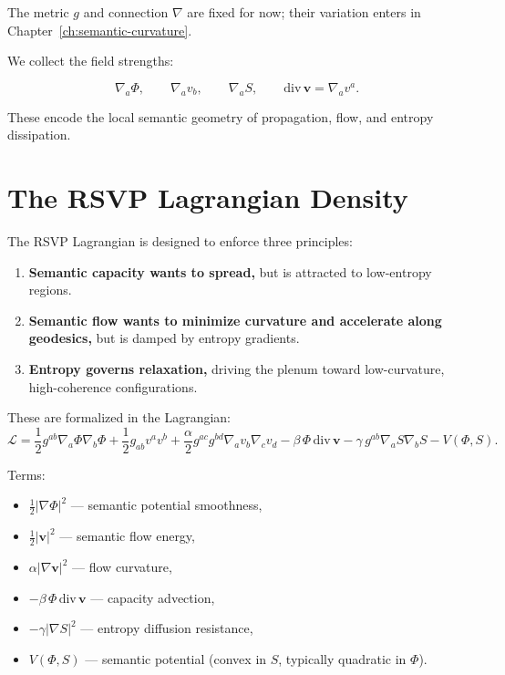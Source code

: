 The metric $g$ and connection $\nabla$ are fixed for now; their variation enters in Chapter~\ref{ch:semantic-curvature}.

We collect the field strengths:

\[
\nabla_a \Phi,
\qquad
\nabla_a v_b,
\qquad
\nabla_a S,
\qquad
\mathrm{div}\,\mathbf{v} = \nabla_a v^a.
\]

These encode the local semantic geometry of propagation, flow, and entropy dissipation.

\section{The RSVP Lagrangian Density}

The RSVP Lagrangian is designed to enforce three principles:

\begin{enumerate}
\item \textbf{Semantic capacity wants to spread,} but is attracted to low-entropy regions.
\item \textbf{Semantic flow wants to minimize curvature and accelerate along geodesics,} but is damped by entropy gradients.
\item \textbf{Entropy governs relaxation,} driving the plenum toward low-curvature, high-coherence configurations.
\end{enumerate}

These are formalized in the Lagrangian:
\begin{equation}
\label{eq:rsvp-lagrangian}
\mathcal{L}
= \frac{1}{2} g^{ab} \nabla_a \Phi \nabla_b \Phi
  + \frac{1}{2} g_{ab} v^a v^b
  + \frac{\alpha}{2} g^{ac} g^{bd} \nabla_a v_b \nabla_c v_d
  - \beta\, \Phi\, \mathrm{div}\,\mathbf{v}
  - \gamma\, g^{ab} \nabla_a S \nabla_b S
  - V(\Phi, S).
\end{equation}

Terms:

\begin{itemize}
\item $\frac{1}{2} |\nabla\Phi|^2$ --- semantic potential smoothness,
\item $\frac{1}{2} |\mathbf{v}|^2$ --- semantic flow energy,
\item $\alpha |\nabla \mathbf{v}|^2$ --- flow curvature,
\item $-\beta \,\Phi\, \mathrm{div}\,\mathbf{v}$ --- capacity advection,
\item $-\gamma |\nabla S|^2$ --- entropy diffusion resistance,
\item $V(\Phi, S)$ --- semantic potential (convex in $S$, typically quadratic in $\Phi$).
\end{itemize}

